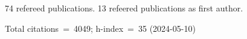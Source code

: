 74 refereed publications. 13 refeered publications as first author.

Total citations~=~4049; h-index~=~35 (2024-05-10)